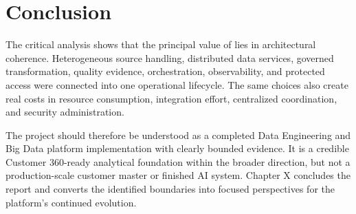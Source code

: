 \section{Conclusion}
The critical analysis shows that the principal value of \projectname{} lies in architectural coherence. Heterogeneous source handling, distributed data services, governed transformation, quality evidence, orchestration, observability, and protected access were connected into one operational lifecycle. The same choices also create real costs in resource consumption, integration effort, centralized coordination, and security administration.

The project should therefore be understood as a completed Data Engineering and Big Data platform implementation with clearly bounded evidence. It is a credible Customer 360-ready analytical foundation within the broader \initiative{} direction, but not a production-scale customer master or finished AI system. Chapter X concludes the report and converts the identified boundaries into focused perspectives for the platform's continued evolution.
